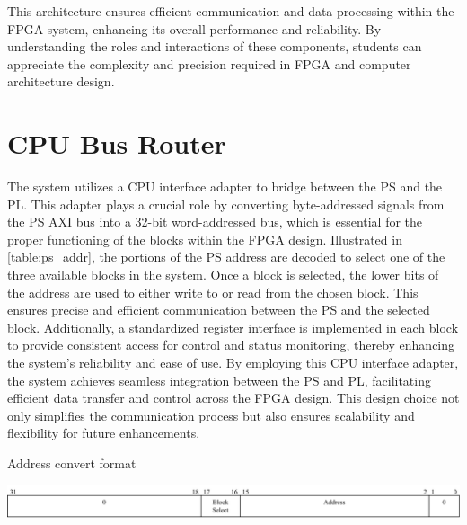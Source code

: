 This architecture ensures efficient communication and data processing within the FPGA system, enhancing its overall performance and reliability. By understanding the roles and interactions of these components, students can appreciate the complexity and precision required in FPGA and computer architecture design.

\section{CPU Bus Router}

The system utilizes a CPU interface adapter to bridge between the PS and the PL. This adapter plays a crucial role by converting byte-addressed signals from the PS AXI bus into a 32-bit word-addressed bus, which is essential for the proper functioning of the blocks within the FPGA design. Illustrated in \autoref{table:ps_addr}, the portions of the PS address are decoded to select one of the three available blocks in the system. Once a block is selected, the lower bits of the address are used to either write to or read from the chosen block. This ensures precise and efficient communication between the PS and the selected block. Additionally, a standardized register interface is implemented in each block to provide consistent access for control and status monitoring, thereby enhancing the system's reliability and ease of use. By employing this CPU interface adapter, the system achieves seamless integration between the PS and PL, facilitating efficient data transfer and control across the FPGA design. This design choice not only simplifies the communication process but also ensures scalability and flexibility for future enhancements.

 
\begin{table}
\centering
\caption{Address convert format}
\includegraphics[width=1.0\textwidth]{figures/pc_address.png}
\label{table:ps_addr}
\end{table}

